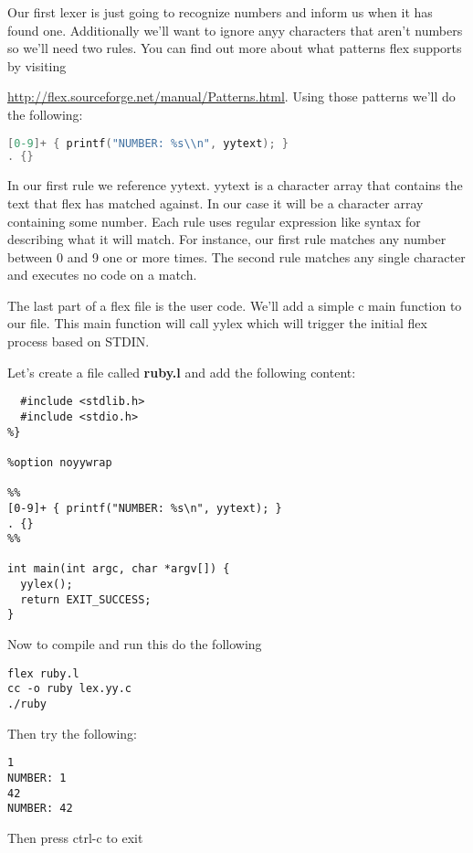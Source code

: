Our first lexer is just going to recognize numbers and inform us when it has found one. Additionally we'll want to ignore anyy characters that aren't numbers so we'll need two rules. You can find out more about what patterns flex supports by visiting {\hyperref[http://flex.sourceforge.net/manual/Patterns.html]{http://flex.sourceforge.net/manual/Patterns.html}. Using those patterns we'll do the following:

\begin{lstlisting}[language=C]
[0-9]+ { printf("NUMBER: %s\\n", yytext); }
. {}
\end{lstlisting}

In our first rule we reference yytext. yytext is a character array that contains the text that flex has matched against. In our case it will be a character array containing some number. Each rule uses regular expression like syntax for describing what it will match. For instance, our first rule matches any number between 0 and 9 one or more times. The second rule matches any single character and executes no code on a match.

The last part of a flex file is the user code. We'll add a simple c main function to our file. This main function will call yylex which will trigger the initial flex process based on STDIN.

Let's create a file called {\bf ruby.l} and add the following content:

\begin{lstlisting}[language=Flex]
%{
  #include <stdlib.h>
  #include <stdio.h>
%}

%option noyywrap

%%
[0-9]+ { printf("NUMBER: %s\n", yytext); }
. {}
%%

int main(int argc, char *argv[]) {
  yylex();
  return EXIT_SUCCESS;
}
\end{lstlisting}

Now to compile and run this do the following

\begin{lstlisting}
flex ruby.l
cc -o ruby lex.yy.c
./ruby
\end{lstlisting}

Then try the following:

\begin{lstlisting}
1
NUMBER: 1
42
NUMBER: 42
\end{lstlisting}

Then press ctrl-c to exit

}
